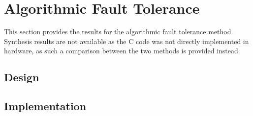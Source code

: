 
\section{Algorithmic Fault Tolerance}
\label{sec:aft}
This section provides the results for the algorithmic fault tolerance method. Synthesis results are not available as the C code was not directly implemented in hardware, as such a comparison between the two methods is provided instead.

\subsection{Design}
\label{sec:aft-des}

\subsection{Implementation}
\label{sec:aft-impl}
